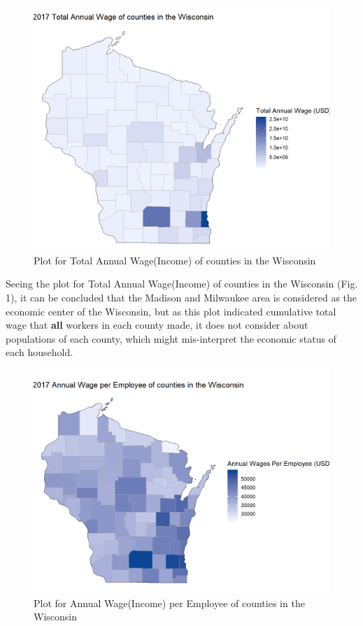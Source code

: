 \documentclass[letterpaper, 10 pt, conference]{ieeeconf}  %
\begin{document}
\begin{figure}
\begin{center}
\includegraphics[width=1.0\linewidth]{2017_Total_Annual_Wage.png}
\end{center}
\caption{Plot for Total Annual Wage(Income) of counties in the Wisconsin}
\label{fig:long}
\label{fig:onecol}
\end{figure}

Seeing the plot for Total Annual Wage(Income) of counties in the Wisconsin (Fig. 1), it can be concluded that the Madison and Milwaukee area is considered as the economic center of the Wisconsin, but as this plot indicated cumulative total wage that \textbf{all} workers in each county made, it does not consider about populations of each county, which might mis-interpret the economic status of each household.

\begin{figure}
\begin{center}
\includegraphics[width=1.0\linewidth]{2017_Annual_Wage_per_Employee.png}
\end{center}
\caption{Plot for Annual Wage(Income) per Employee of counties in the Wisconsin}
\label{fig:long}
\label{fig:onecol}
\end{figure}
\end{document}
